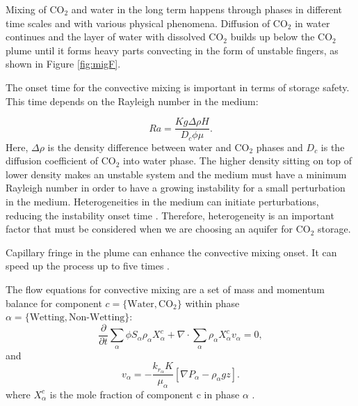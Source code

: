 Mixing of $\mbox{CO}_2$ and water in the long term happens through phases in
different time scales and with various physical phenomena. Diffusion of
$\mbox{CO}_2$ in water continues and the layer of water with dissolved
$\mbox{CO}_2$
builds up below the $\mbox{CO}_2$ plume until it forms heavy parts convecting in
the form of unstable fingers, as shown in Figure \ref{fig:migF}.

The onset time for the convective mixing is important in terms of storage
safety. This time depends on the Rayleigh number in the medium:

\begin{equation}
 Ra = \frac{Kg\Delta \rho H}{D_c \phi \mu}.
 \label{Ra}
\end{equation} Here, $\Delta \rho$ is the density difference between water and
$\mbox{CO}_2$ phases and $D_c$ is the diffusion coefficient of $\mbox{CO}_2$
into water phase. The higher density sitting on top of lower density makes an
unstable system and the medium must have a minimum Rayleigh number in order to
have a growing instability for a small perturbation in the medium.
Heterogeneities in the medium can initiate perturbations, reducing the
instability onset time \cite{hassanzadeh2005modelling,elenius2012time}.
Therefore, heterogeneity is an important factor that must be considered when we
are choosing an aquifer for $\mbox{CO}_2$ storage.

Capillary fringe in the plume can enhance the convective mixing onset. It can
speed up the process up to five times \cite{eleniuseffects}.

The flow equations for convective mixing are a set of mass and momentum balance
for component $c=\{\mbox{Water},\mbox{CO}_2\}$ within phase
$\alpha=\{\mbox{Wetting},\mbox{Non-Wetting}\}$:
\begin{equation}
\frac{\partial}{\partial t} \underset{\alpha}{\sum}\phi S_\alpha \rho_\alpha
X_{\alpha}^c + \nabla \cdot \underset{\alpha}{\sum} \rho_\alpha X_{\alpha}^c
v_\alpha = 0,   
 \label{eq:massCo2}
\end{equation} and 
\begin{equation}
 v_\alpha = -\frac{k_{r_\alpha}K}{\mu_\alpha} \left[  \nabla
P_\alpha-\rho_\alpha g z \right].
 \label{eq:darcyCo2}
\end{equation} where $X_{\alpha}^c$ is the mole fraction of
component $\mbox{c}$ in phase $\alpha$ \cite{elenius2010co2}. 

